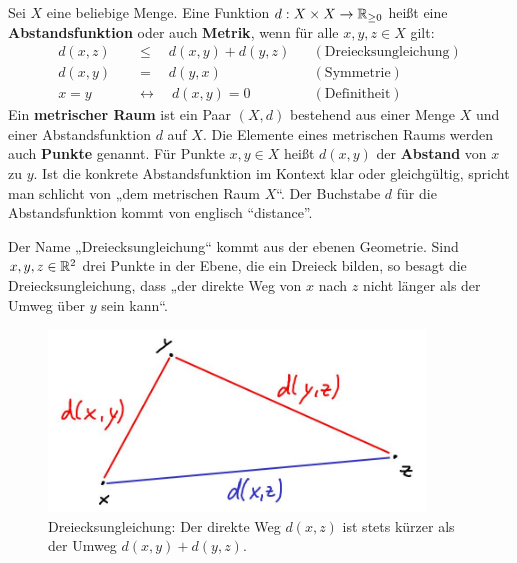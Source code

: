 \begin{de}[* Abstandsfunktion] \label{def:abstand}    
    Sei $X$ eine beliebige Menge. Eine Funktion $d:X\times X\to \mathbb R_{\ge 0}$ heißt eine \textbf{Abstandsfunktion} oder auch \textbf{Metrik}, wenn für alle $x,y,z\in X$ gilt:
    \begin{align*}
        d(x,z) \quad&\le\quad d(x,y)+d(y,z) && (\text{Dreiecksungleichung}) \\
        d(x,y) \quad&=\quad d(y,x) && (\text{Symmetrie}) \\
        x=y \quad&\leftrightarrow\quad d(x,y)=0 && (\text{Definitheit})
    \end{align*}
    Ein \textbf{metrischer Raum} ist ein Paar $(X,d)$ bestehend aus einer Menge $X$ und einer Abstandsfunktion $d$ auf $X$. Die Elemente eines metrischen Raums werden auch \textbf{Punkte} genannt. Für Punkte $x,y\in X$ heißt $d(x,y)$ der \textbf{Abstand} von $x$ zu $y$. Ist die konkrete Abstandsfunktion im Kontext klar oder gleichgültig, spricht man schlicht von „dem metrischen Raum $X$“. Der Buchstabe $d$ für die Abstandsfunktion kommt von englisch ``distance''. 
\end{de}


\begin{bem}
    Der Name „Dreiecksungleichung“ kommt aus der ebenen Geometrie. Sind $x,y,z\in \mathbb R^2$ drei Punkte in der Ebene, die ein Dreieck bilden, so besagt die Dreiecksungleichung, dass „der direkte Weg von $x$ nach $z$ nicht länger als der Umweg über $y$ sein kann“.
    \begin{figure}[ht]
        \includegraphics[width=10cm]{./_img/Dreiecksungleichung.jpeg}
        \centering \caption{Dreiecksungleichung: Der direkte Weg $d(x,z)$ ist stets kürzer als der Umweg $d(x,y)+d(y,z)$.}
    \end{figure}
\end{bem}


